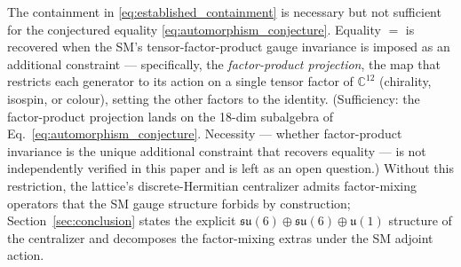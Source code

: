 The containment in \eqref{eq:established_containment} is necessary
but not sufficient for the conjectured equality
\eqref{eq:automorphism_conjecture}.  Equality $=$ is recovered
when the SM's tensor-factor-product gauge invariance is imposed
as an additional constraint --- specifically, the
\emph{factor-product projection}, the map that restricts each
generator to its action on a single tensor factor of
$\mathbb{C}^{12}$ (chirality, isospin, or colour), setting the
other factors to the identity.  (Sufficiency: the factor-product
projection lands on the 18-dim subalgebra of
Eq.~\eqref{eq:automorphism_conjecture}.  Necessity --- whether
factor-product invariance is the unique additional constraint that
recovers equality --- is not independently verified in this paper
and is left as an open question.)  Without this restriction, the
lattice's discrete-Hermitian centralizer admits factor-mixing
operators that the SM gauge structure forbids by construction;
Section~\ref{sec:conclusion} states the explicit
$\mathfrak{su}(6) \oplus \mathfrak{su}(6) \oplus \mathfrak{u}(1)$
structure of the centralizer and decomposes the factor-mixing
extras under the SM adjoint action.


